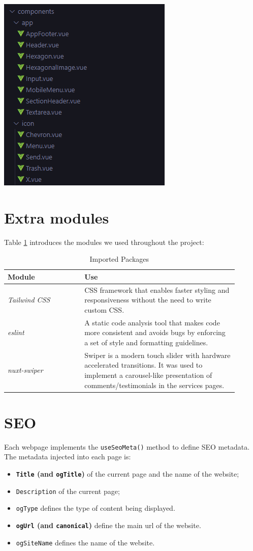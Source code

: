 \begin{center}
    \includegraphics[width=0.4\linewidth]{img/components-structure.png}
\end{center}


\section{Extra modules}
Table \ref{table:modules} introduces the modules we used throughout the project:
\begin{table}[h!]
            \centering
            \begin{tabular}{|m{0.3\linewidth}|m{0.6\linewidth}|}
            \hline
            \textbf{Module} & \textbf{Use}\\
            \hline
                 \textit{Tailwind CSS} & CSS framework that enables faster styling and responsiveness without the need to write custom CSS.  \\
            \hline
                 \textit{eslint} & A static code analysis tool that makes code more consistent and avoids bugs by enforcing a set of style and formatting guidelines.  \\
            \hline
            \textit{nuxt-swiper} & Swiper is a modern touch slider with hardware accelerated transitions. It was used to implement a carousel-like presentation of comments/testimonials in the services pages.  \\
            \hline
            \end{tabular}
            \caption{Imported Packages}
            \label{table:modules}
\end{table}

\section{SEO}
Each webpage implements the \texttt{useSeoMeta()} method to define SEO metadata. The metadata injected into each page is:
\begin{itemize}
	\item \textbf{\texttt{Title} (and \texttt{ogTitle})} of the current page and the name of the website;
	\item \texttt{Description} of the current page;
	\item \texttt{ogType} defines the type of content being displayed.
	\item \textbf{\texttt{ogUrl} (and \texttt{canonical})} define the main url of the website.
	\item \texttt{ogSiteName} defines the name of the website.
\end{itemize}

